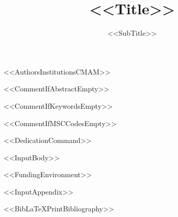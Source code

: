 \documentclass[%
USenglish,
<<DocumentClassOptions>>]{article}
\begin{document}

\title{<<Title>>}
\subtitle{<<SubTitle>>}

<<AuthorsInstitutionsCMAM>>

<<CommentIfAbstractEmpty>>

<<CommentIfKeywordsEmpty>>

<<CommentIfMSCCodesEmpty>>

<<DedicationCommand>>
\aop
{}

\maketitle

<<InputBody>>

<<FundingEnvironment>>

\appendix
<<InputAppendix>>

<<BibLaTeXPrintBibliography>>
\end{document}
